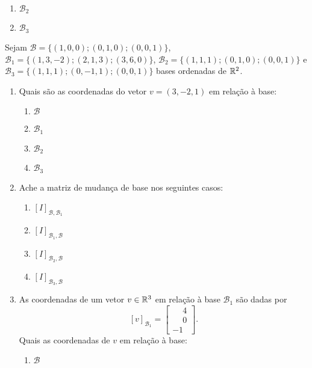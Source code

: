 \documentclass[12pt]{exam}
\begin{document}
\begin{exercicio}
\begin{enumerate}[label={\alph*})]
\begin{enumerate}[label={\roman*})]
            \item $\mathcal{B}_2$

            \item $\mathcal{B}_3$
        \end{enumerate}
    \end{enumerate}
\end{exercicio}

\begin{exercicio}
    Sejam $\mathcal{B} = \{(1,0,0);(0,1,0);(0,0,1)\}$, $\mathcal{B}_1 = \{(1,3,-2);(2,1,3);(3,6,0)\}$, \linebreak $\mathcal{B}_2 = \{(1,1,1);(0,1,0);(0,0,1)\}$ e $\mathcal{B}_3 = \{(1,1,1);(0,-1,1);(0,0,1)\}$ bases ordenadas de $\mathbb{R}^2$.
    \begin{enumerate}[label={\alph*})]
        \item Quais são as coordenadas do vetor $v = (3,-2,1)$ em relação à base:
        \begin{enumerate}[label={\roman*})]
            \item $\mathcal{B}$

            \item $\mathcal{B}_1$

            \item $\mathcal{B}_2$

            \item $\mathcal{B}_3$
        \end{enumerate}
        \item Ache a matriz de mudança de base nos seguintes casos:
        \begin{enumerate}[label={\roman*})]
            \item $[I]_{\mathcal{B},\mathcal{B}_1}$

            \item $[I]_{\mathcal{B}_1,\mathcal{B}}$

            \item $[I]_{\mathcal{B}_2,\mathcal{B}}$

            \item $[I]_{\mathcal{B}_3,\mathcal{B}}$
        \end{enumerate}
        \item As coordenadas de um vetor $v \in \mathbb{R}^3$ em relação à base $\mathcal{B}_1$ são dadas por
        \[
        [v]_{\mathcal{B}_1} = \begin{bmatrix}
            \phantom{-}4\\\phantom{-}0\\-1
        \end{bmatrix}.
        \]
        Quais as coordenadas de $v$ em relação à base:
        \begin{enumerate}[label={\roman*})]
            \item $\mathcal{B}$


\end{enumerate}
\end{enumerate}
\end{exercicio}
\end{document}
